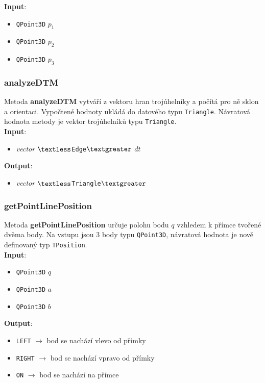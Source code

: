 \documentclass[a4paper, 12pt]{article}
\begin{document}
\textbf{Input}:
\begin{itemize}
\item \texttt{QPoint3D} $p_1$
\item \texttt{QPoint3D} $p_2$
\item \texttt{QPoint3D} $p_3$
\end{itemize}

\subsubsection*{analyzeDTM}
Metoda \textbf{analyzeDTM} vytváří z vektoru hran trojúhelníky a počítá pro ně sklon a orientaci. Vypočtené hodnoty ukládá do datového typu \texttt{Triangle}. Návratová hodnota metody je vektor trojúhelníků typu \texttt{Triangle}.\\

\textbf{Input}:
\begin{itemize}
\item \textsl{vector} $\textless$\texttt{Edge}$\textgreater$ $dt$
\end{itemize}

\textbf{Output}:
\begin{itemize}
\item \textsl{vector} $\textless$\texttt{Triangle}$\textgreater$
\end{itemize}

\subsubsection*{getPointLinePosition}
Metoda \textbf{getPointLinePosition} určuje polohu bodu $q$ vzhledem k přímce tvořené dvěma body. Na vstupu jsou 3 body typu \texttt{QPoint3D}, návratová hodnota je nově definovaný typ \texttt{TPosition}.\\

\textbf{Input}:
\begin{itemize}
\item \texttt{QPoint3D} $q$
\item \texttt{QPoint3D} $a$
\item \texttt{QPoint3D} $b$
\end{itemize}

\textbf{Output}:
\begin{itemize}
\item \texttt{LEFT} $\rightarrow$ bod se nachází vlevo od přímky
\item \texttt{RIGHT} $\rightarrow$ bod se nachází vpravo od přímky
\item \texttt{ON} $\rightarrow$ bod se nachází na přímce
\end{itemize}
\end{document}
